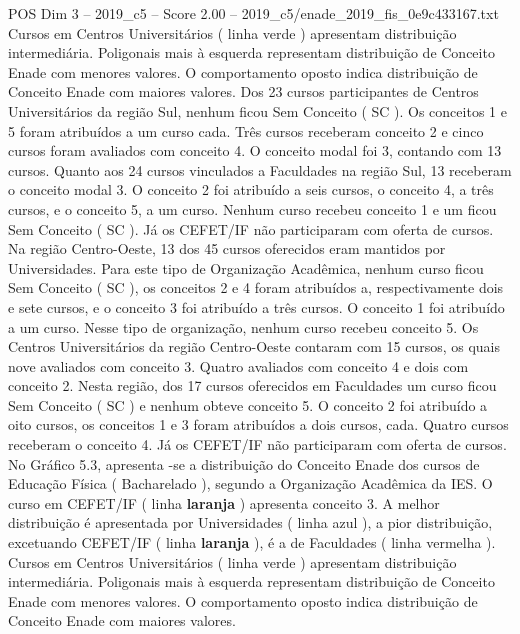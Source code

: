 \begin{textsample}{POS Dim 3 – 2019\_c5 – Score 2.00 – 2019\_c5/enade\_2019\_fis\_0e9c433167.txt}
Cursos em Centros Universitários ( linha verde ) apresentam distribuição intermediária.
Poligonais mais à esquerda representam distribuição de Conceito Enade com menores valores.
O comportamento oposto indica distribuição de Conceito Enade com maiores valores.
Dos 23 cursos participantes de Centros Universitários da região Sul, nenhum ficou Sem Conceito ( SC ).
Os conceitos 1 e 5 foram atribuídos a um curso cada.
Três cursos receberam conceito 2 e cinco cursos foram avaliados com conceito 4.
O conceito modal foi 3, contando com 13 cursos.
Quanto aos 24 cursos vinculados a Faculdades na região Sul, 13 receberam o conceito modal 3.
O conceito 2 foi atribuído a seis cursos, o conceito 4, a três cursos, e o conceito 5, a um curso.
Nenhum curso recebeu conceito 1 e um ficou Sem Conceito ( SC ).
Já os CEFET/IF não participaram com oferta de cursos.
Na região Centro-Oeste, 13 dos 45 cursos oferecidos eram mantidos por Universidades.
Para este tipo de Organização Acadêmica, nenhum curso ficou Sem Conceito ( SC ), os conceitos 2 e 4 foram atribuídos a, respectivamente dois e sete cursos, e o conceito 3 foi atribuído a três cursos.
O conceito 1 foi atribuído a um curso.
Nesse tipo de organização, nenhum curso recebeu conceito 5.
Os Centros Universitários da região Centro-Oeste contaram com 15 cursos, os quais nove avaliados com conceito 3.
Quatro avaliados com conceito 4 e dois com conceito 2.
Nesta região, dos 17 cursos oferecidos em Faculdades um curso ficou Sem Conceito ( SC ) e nenhum obteve conceito 5.
O conceito 2 foi atribuído a oito cursos, os conceitos 1 e 3 foram atribuídos a dois cursos, cada.
Quatro cursos receberam o conceito 4.
Já os CEFET/IF não participaram com oferta de cursos.
No Gráfico 5.3, apresenta -se a distribuição do Conceito Enade dos cursos de Educação Física ( Bacharelado ), segundo a Organização Acadêmica da IES.
O curso em CEFET/IF ( linha \textbf{laranja} ) apresenta conceito 3.
A melhor distribuição é apresentada por Universidades ( linha azul ), a pior distribuição, excetuando CEFET/IF ( linha \textbf{laranja} ), é a de Faculdades ( linha vermelha ).
Cursos em Centros Universitários ( linha verde ) apresentam distribuição intermediária.
Poligonais mais à esquerda representam distribuição de Conceito Enade com menores valores.
O comportamento oposto indica distribuição de Conceito Enade com maiores valores.

\end{textsample}
